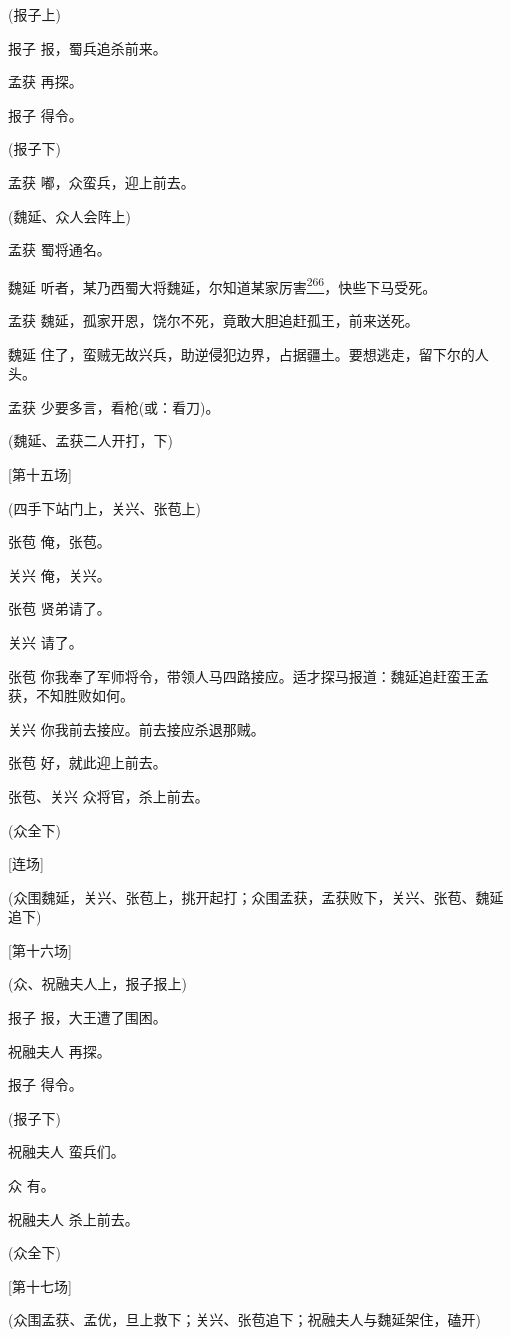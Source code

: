 (报子上)

报子 报，蜀兵追杀前来。

孟获 再探。

报子 得令。

(报子下)

孟获 嘟，众蛮兵，迎上前去。

(魏延、众人会阵上)

孟获 蜀将通名。

魏延
听者，某乃西蜀大将魏延，尔知道某家厉害\protect\hyperlink{fn266}{\textsuperscript{266}}，快些下马受死。

孟获 魏延，孤家开恩，饶尔不死，竟敢大胆追赶孤王，前来送死。

魏延
住了，蛮贼无故兴兵，助逆侵犯边界，占据疆土。要想逃走，留下尔的人头。

孟获 少要多言，看枪(或：看刀)。

(魏延、孟获二人开打，下)

{[}第十五场{]}

(四手下站门上，关兴、张苞上)

张苞 俺，张苞。

关兴 俺，关兴。

张苞 贤弟请了。

关兴 请了。

张苞
你我奉了军师将令，带领人马四路接应。适才探马报道：魏延追赶蛮王孟获，不知胜败如何。

关兴 你我前去接应。前去接应杀退那贼。

张苞 好，就此迎上前去。

张苞、关兴 众将官，杀上前去。

(众全下)

{[}连场{]}

(众围魏延，关兴、张苞上，挑开起打；众围孟获，孟获败下，关兴、张苞、魏延追下)

{[}第十六场{]}

(众、祝融夫人上，报子报上)

报子 报，大王遭了围困。

祝融夫人 再探。

报子 得令。

(报子下)

祝融夫人 蛮兵们。

众 有。

祝融夫人 杀上前去。

(众全下)

{[}第十七场{]}

(众围孟获、孟优，旦上救下；关兴、张苞追下；祝融夫人与魏延架住，磕开)

